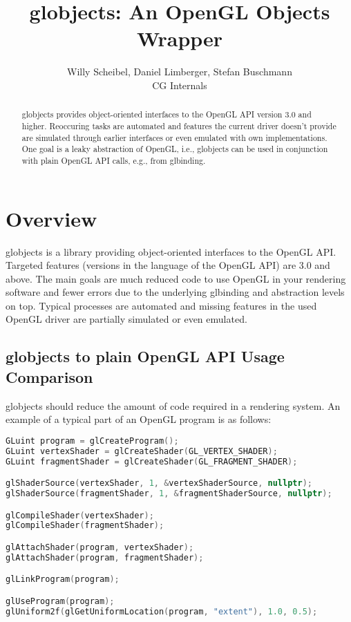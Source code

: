 \documentclass{article}
\begin{document}
\title{globjects: An OpenGL Objects Wrapper}
\author{Willy Scheibel, Daniel Limberger, Stefan Buschmann\\CG Internals}

\maketitle

\begin{abstract}
\noindent
globjects provides object-oriented interfaces to the OpenGL API version 3.0 and higher. Reoccuring tasks are automated and features the current driver doesn't provide are simulated through earlier interfaces or even emulated with own implementations. One goal is a leaky abstraction of OpenGL, i.e., globjects can be used in conjunction with plain OpenGL API calls, e.g., from glbinding.

\end{abstract}

\setcounter{tocdepth}{2}
\tableofcontents

\newpage

\section{Overview}

globjects is a library providing object-oriented interfaces to the OpenGL API. Targeted features (versions in the language of the OpenGL API) are 3.0 and above.
The main goals are much reduced code to use OpenGL in your rendering software and fewer errors due to the underlying glbinding and abstraction levels on top. Typical processes are automated and missing features in the used OpenGL driver are partially simulated or even emulated.

\subsection{globjects to plain OpenGL API Usage Comparison}

globjects should reduce the amount of code required in a rendering system. An example of a typical part of an OpenGL program is as follows:

\begin{lstlisting}[language=c++,frame=single,basicstyle=\footnotesize]
GLuint program = glCreateProgram();
GLuint vertexShader = glCreateShader(GL_VERTEX_SHADER);
GLuint fragmentShader = glCreateShader(GL_FRAGMENT_SHADER);

glShaderSource(vertexShader, 1, &vertexShaderSource, nullptr);
glShaderSource(fragmentShader, 1, &fragmentShaderSource, nullptr);

glCompileShader(vertexShader);
glCompileShader(fragmentShader);

glAttachShader(program, vertexShader);
glAttachShader(program, fragmentShader);

glLinkProgram(program);

glUseProgram(program);
glUniform2f(glGetUniformLocation(program, "extent"), 1.0, 0.5);
\end{lstlisting}
\end{document}
